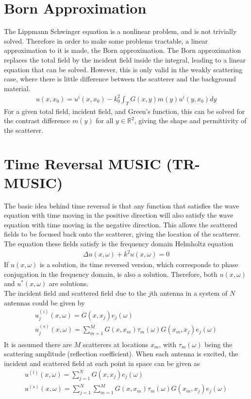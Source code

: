 \documentclass[14pt]{article}
\begin{document}
	\section{Born Approximation}
		The Lippmann Schwinger equation is a nonlinear problem, and is not trivially
		solved.  Therefore in order to make some problems tractable, a linear 
		approximation to it is made, the Born approximation.  The Born approximation
		replaces the total field by the incident field inside the integral, leading
		to a linear equation that can be solved.  However, this is only valid in the
		weakly scattering case, where there is little difference between the 
		scatterer and the background material.
		\begin{align}
			u(x,x_0) = u^i(x,x_0) - k_0^2 \int_T G(x,y) m(y)u^i(y,x_0) dy
		\end{align}
		For a given total field, incident field, and Green's function, this can
		be solved for the contrast difference $m(y)$ for all $y \in \mathbb{R}^2$,
		giving the shape and permittivity of the scatterer.

	\section{Time Reversal MUSIC (TR-MUSIC)}

			The basic idea behind time reversal is that any function that satisfies the
	wave equation with time moving in the positive direction will also satisfy the
	wave equation with time moving in the negative direction.  This allows the
	scattered fields to be focused back onto the scatterer, giving the location
	of the scatterer.~\\

		The equation these fields satisfy is the frequency domain Helmholtz equation
	\begin{align}
		\Delta u(x,\omega) + k^2 u(x,\omega) = 0
	\end{align}
	If $u(x,\omega)$ is a solution, its time reversed version, which corresponds
	to phase conjugation in the frequency domain, is also a solution.  Therefore,
	both $u(x,\omega)$ and $u^*(x,\omega)$ are solutions.~\\

		The incident field and scattered field due to the $j$th antenna in a system
	of $N$ antennas could be given by
	\begin{align}
		u_j^{(i)}(x,\omega) = G(x,x_j)e_j(\omega) \\
		u_j^{(s)}(x,\omega) = \sum_{m=1}^MG(x,x_m)\tau_m(\omega)G(x_m,x_j)e_j(\omega) \\
	\end{align}
	It is assumed there are $M$ scatterers at locations $x_m$, with $\tau_m(\omega)$ being the 
	scattering amplitude (reflection coefficient).  When each antenna is excited,
	the incident and scattered field at each point in space can be given as
	\begin{align}
		u^{(i)}(x,\omega) = \sum_{j=1}^N G(x,x_j)e_j(\omega) \\
		u^{(s)}(x,\omega) = \sum_{j=1}^N \sum_{m=1}^M G(x,x_m)\tau_m(\omega)G(x_m,x_j)e_j(\omega)
	\end{align}
	
\end{document}
